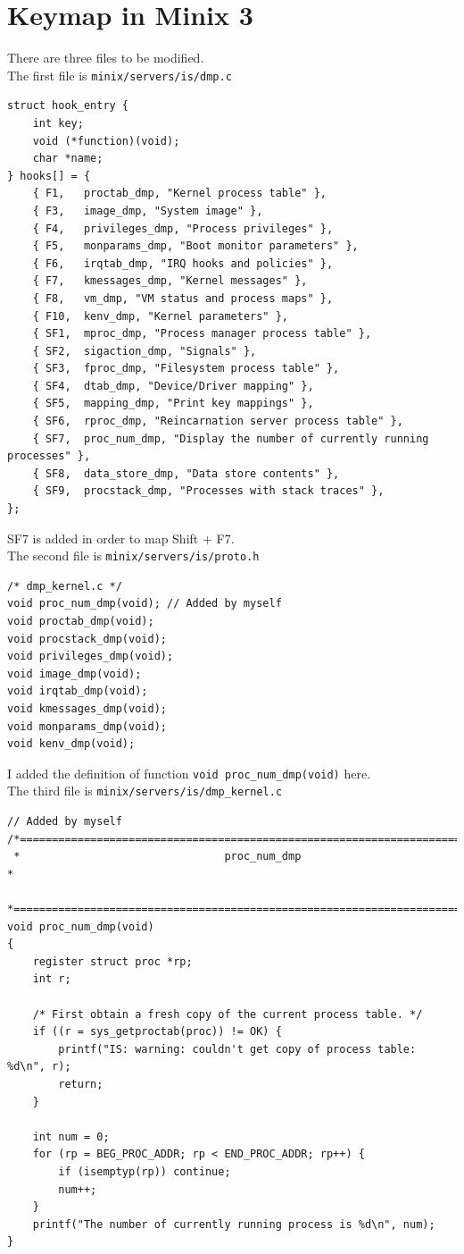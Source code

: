 \documentclass{article}
\begin{document}
\section{Keymap in Minix 3}
There are three files to be modified.\\

The first file is \texttt{minix/servers/is/dmp.c}

\begin{verbatim}
struct hook_entry {
    int key;
    void (*function)(void);
    char *name;
} hooks[] = {
    { F1,   proctab_dmp, "Kernel process table" },
    { F3,   image_dmp, "System image" },
    { F4,   privileges_dmp, "Process privileges" },
    { F5,   monparams_dmp, "Boot monitor parameters" },
    { F6,   irqtab_dmp, "IRQ hooks and policies" },
    { F7,   kmessages_dmp, "Kernel messages" },
    { F8,   vm_dmp, "VM status and process maps" },
    { F10,  kenv_dmp, "Kernel parameters" },
    { SF1,  mproc_dmp, "Process manager process table" },
    { SF2,  sigaction_dmp, "Signals" },
    { SF3,  fproc_dmp, "Filesystem process table" },
    { SF4,  dtab_dmp, "Device/Driver mapping" },
    { SF5,  mapping_dmp, "Print key mappings" },
    { SF6,  rproc_dmp, "Reincarnation server process table" },
    { SF7,  proc_num_dmp, "Display the number of currently running processes" },
    { SF8,  data_store_dmp, "Data store contents" },
    { SF9,  procstack_dmp, "Processes with stack traces" },
};
\end{verbatim}

SF7 is added in order to map Shift + F7.\\

The second file is \texttt{minix/servers/is/proto.h}
\begin{verbatim}
/* dmp_kernel.c */
void proc_num_dmp(void); // Added by myself
void proctab_dmp(void);
void procstack_dmp(void);
void privileges_dmp(void);
void image_dmp(void);
void irqtab_dmp(void);
void kmessages_dmp(void);
void monparams_dmp(void);
void kenv_dmp(void);
\end{verbatim}

I added the definition of function \texttt{void proc_num_dmp(void)} here.\\

The third file is \texttt{minix/servers/is/dmp_kernel.c}
\begin{verbatim}
// Added by myself
/*===========================================================================*
 *                                proc_num_dmp                               *
 *===========================================================================*/
void proc_num_dmp(void)
{
    register struct proc *rp;
    int r;

    /* First obtain a fresh copy of the current process table. */
    if ((r = sys_getproctab(proc)) != OK) {
        printf("IS: warning: couldn't get copy of process table: %d\n", r);
        return;
    }

    int num = 0;
    for (rp = BEG_PROC_ADDR; rp < END_PROC_ADDR; rp++) {
        if (isemptyp(rp)) continue;
        num++;
    }
    printf("The number of currently running process is %d\n", num);
}
\end{verbatim}
\end{document}
